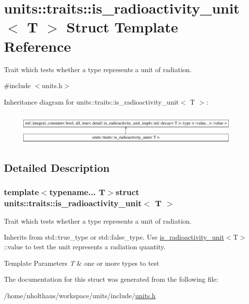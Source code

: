 \hypertarget{structunits_1_1traits_1_1is__radioactivity__unit}{}\section{units\+:\+:traits\+:\+:is\+\_\+radioactivity\+\_\+unit$<$ T $>$ Struct Template Reference}
\label{structunits_1_1traits_1_1is__radioactivity__unit}


Trait which tests whether a type represents a unit of radiation.  




{\ttfamily \#include $<$units.\+h$>$}

Inheritance diagram for units\+:\+:traits\+:\+:is\+\_\+radioactivity\+\_\+unit$<$ T $>$\+:\begin{figure}[H]
\begin{center}
\leavevmode
\includegraphics[height=1.694402cm]{structunits_1_1traits_1_1is__radioactivity__unit}
\end{center}
\end{figure}


\subsection{Detailed Description}
\subsubsection*{template$<$typename... T$>$struct units\+::traits\+::is\+\_\+radioactivity\+\_\+unit$<$ T $>$}

Trait which tests whether a type represents a unit of radiation. 

Inherits from {\ttfamily std\+::true\+\_\+type} or {\ttfamily std\+::false\+\_\+type}. Use {\ttfamily \hyperlink{structunits_1_1traits_1_1is__radioactivity__unit}{is\+\_\+radioactivity\+\_\+unit}$<$T$>$\+::value} to test the unit represents a radiation quantity. 
\begin{DoxyTemplParams}{Template Parameters}
{\em T} & one or more types to test \\
\hline
\end{DoxyTemplParams}


The documentation for this struct was generated from the following file\+:\begin{DoxyCompactItemize}
\item 
/home/nholthaus/workspace/units/include/\hyperlink{units_8h}{units.\+h}\end{DoxyCompactItemize}
